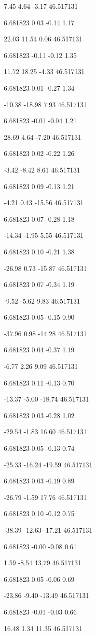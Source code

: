 7.45
4.64
-3.17
46.517131

6.681823
0.03
-0.14
1.17

22.03
11.54
0.06
46.517131

6.681823
-0.11
-0.12
1.35

11.72
18.25
-4.33
46.517131

6.681823
0.01
-0.27
1.34

-10.38
-18.98
7.93
46.517131

6.681823
-0.01
-0.04
1.21

28.69
4.64
-7.20
46.517131

6.681823
0.02
-0.22
1.26

-3.42
-8.42
8.61
46.517131

6.681823
0.09
-0.13
1.21

-4.21
0.43
-15.56
46.517131

6.681823
0.07
-0.28
1.18

-14.34
-1.95
5.55
46.517131

6.681823
0.10
-0.21
1.38

-26.98
0.73
-15.87
46.517131

6.681823
0.07
-0.34
1.19

-9.52
-5.62
9.83
46.517131

6.681823
0.05
-0.15
0.90

-37.96
0.98
-14.28
46.517131

6.681823
0.04
-0.37
1.19

-6.77
2.26
9.09
46.517131

6.681823
0.11
-0.13
0.70

-13.37
-5.00
-18.74
46.517131

6.681823
0.03
-0.28
1.02

-29.54
-1.83
16.60
46.517131

6.681823
0.05
-0.13
0.74

-25.33
-16.24
-19.59
46.517131

6.681823
0.03
-0.19
0.89

-26.79
-1.59
17.76
46.517131

6.681823
0.10
-0.12
0.75

-38.39
-12.63
-17.21
46.517131

6.681823
-0.00
-0.08
0.61

1.59
-8.54
13.79
46.517131

6.681823
0.05
-0.06
0.69

-23.86
-9.40
-13.49
46.517131

6.681823
-0.01
-0.03
0.66

16.48
1.34
11.35
46.517131

